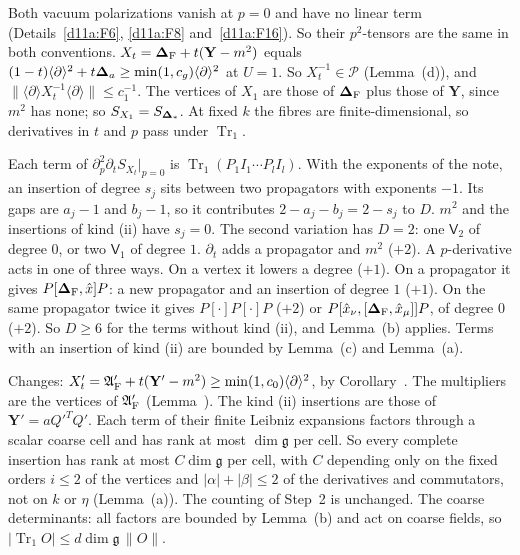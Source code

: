 \begin{detail}\label{d11a:F15}
\begin{step}[Set-up]
Both vacuum polarizations vanish at $p=0$ and have no linear term (Details~\ref{d11a:F6}, \ref{d11a:F8} and~\ref{d11a:F16}). So their $p^2$-tensors are the same in both conventions. $X_t=\boldsymbol{\Delta}_{\rm F}+t(\mathbf Y-m^2)$ equals $(1-t)\langle\partial\rangle^2+t\boldsymbol{\Delta}_a\ge\min(1,c_g)\langle\partial\rangle^2$ at $U=1$. So $X_t^{-1}\in\mathscr P$ (Lemma~(d)), and $\|\langle\partial\rangle X_t^{-1}\langle\partial\rangle\|\le c_1^{-1}$. The vertices of $X_1$ are those of $\boldsymbol{\Delta}_{\rm F}$ plus those of $\mathbf Y$, since $m^2$ has none; so $S_{X_1}=S_{\boldsymbol{\Delta}_*}$. At fixed $k$ the fibres are finite-dimensional, so derivatives in $t$ and $p$ pass under $\operatorname{Tr}_1$.
\end{step}
\begin{step}[Counting]
Each term of $\partial_p^2\partial_tS_{X_t}|_{p=0}$ is $\operatorname{Tr}_1(P_1I_1\cdots P_lI_l)$. With the exponents of the note, an insertion of degree $s_j$ sits between two propagators with exponents $-1$. Its gaps are $a_j-1$ and $b_j-1$, so it contributes $2-a_j-b_j=2-s_j$ to $D$. $m^2$ and the insertions of kind (ii) have $s_j=0$. The second variation has $D=2$: one $\mathsf V_2$ of degree $0$, or two $\mathsf V_1$ of degree $1$. $\partial_t$ adds a propagator and $m^2$ ($+2$). A $p$-derivative acts in one of three ways. On a vertex it lowers a degree ($+1$). On a propagator it gives $P[\boldsymbol{\Delta}_{\rm F},\hat x]P$: a new propagator and an insertion of degree $1$ ($+1$). On the same propagator twice it gives $P[\cdot]P[\cdot]P$ ($+2$) or $P[\hat x_\nu,[\boldsymbol{\Delta}_{\rm F},\hat x_\mu]]P$, of degree $0$ ($+2$). So $D\ge6$ for the terms without kind (ii), and Lemma~(b) applies. Terms with an insertion of kind (ii) are bounded by Lemma~(c) and Lemma~(a).
\end{step}
\begin{step}
Changes: $X'_t=\mathfrak A'_{\rm F}+t(\mathbf Y'-m^2)\ge\min(1,c_0)\langle\partial\rangle^2$, by Corollary~. The multipliers are the vertices of $\mathfrak A'_{\rm F}$ (Lemma~). The kind (ii) insertions are those of $\mathbf Y'=aQ'^TQ'$. Each term of their finite Leibniz expansions factors through a scalar coarse cell and has rank at most $\dim\mathfrak g$ per cell. So every complete insertion has rank at most $C\dim\mathfrak g$ per cell, with $C$ depending only on the fixed orders $i\le2$ of the vertices and $|\alpha|+|\beta|\le2$ of the derivatives and commutators, not on $k$ or $\eta$ (Lemma~(a)). The counting of Step~2 is unchanged. The coarse determinants: all factors are bounded by Lemma~(b) and act on coarse fields, so $|\operatorname{Tr}_1O|\le d\dim\mathfrak g\,\|O\|$.
\end{step}
\end{detail}

